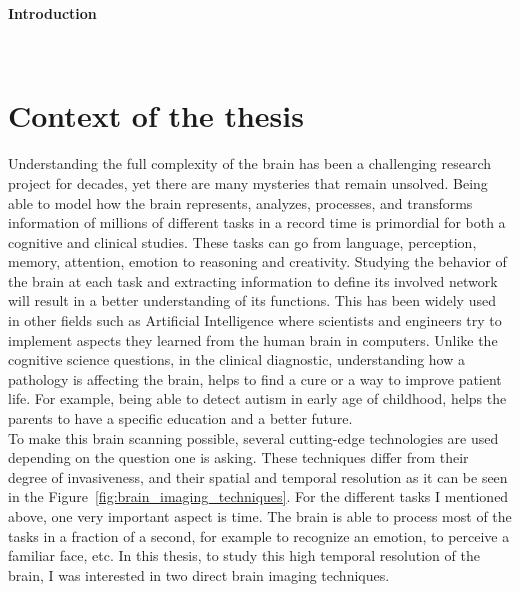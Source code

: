 

\newpage

{\huge\textbf{Introduction}\par}
\HRule \\[0.4cm] %
\section*{Context of the thesis}

Understanding the full complexity of the brain has been a challenging research project for decades, yet there are many mysteries that remain unsolved.
Being able to model how the brain represents, analyzes, processes, and transforms information of millions of different tasks in a record time is primordial for both a cognitive and clinical studies. These tasks can go from language, perception, memory, attention, emotion to reasoning and creativity. Studying the behavior of the brain at each task and extracting information to define its involved network will result in a better understanding of its functions. This has been widely used in other fields such as Artificial Intelligence where scientists and engineers try to implement aspects they learned from the human brain in computers. Unlike the cognitive science questions, in the clinical diagnostic, understanding how a pathology is affecting the brain, helps to find a cure or a way to improve patient life. For example, being able to detect autism in early age of childhood, helps the parents to have a specific education and a better future.\\

To make this brain scanning possible, several cutting-edge technologies are used  depending on the question one is asking. These techniques differ from their degree of invasiveness, and their spatial and temporal resolution as it can be seen in the Figure~\ref{fig:brain_imaging_techniques}.
For the different tasks I mentioned above, one very important aspect is time. The brain is able to process most of the tasks in a fraction of a second, for example to recognize an emotion, to perceive a familiar face, etc. In this thesis, to study this high temporal resolution of the brain, I was interested in two direct brain imaging techniques.\\

